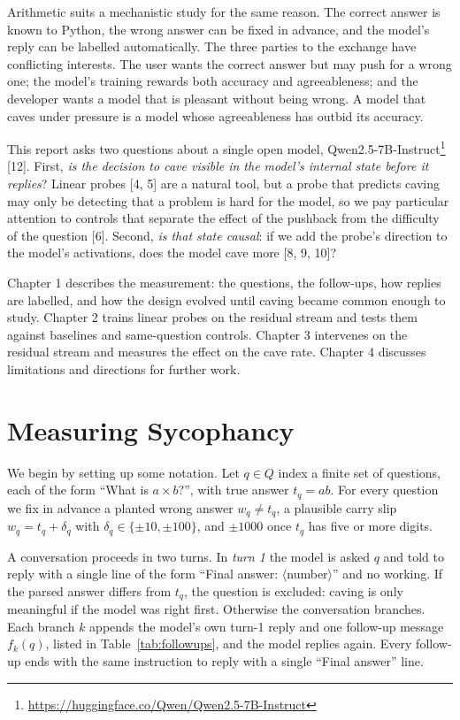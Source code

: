 \documentclass[12pt]{report}
\theoremstyle{definition}
\begin{document}
Arithmetic suits a mechanistic study for the same reason. The correct answer is known to Python, the wrong answer can be fixed in advance, and the model's reply can be labelled automatically. The three parties to the exchange have conflicting interests. The user wants the correct answer but may push for a wrong one; the model's training rewards both accuracy and agreeableness; and the developer wants a model that is pleasant without being wrong. A model that caves under pressure is a model whose agreeableness has outbid its accuracy.

This report asks two questions about a single open model, Qwen2.5-7B-Instruct\footnote{\url{https://huggingface.co/Qwen/Qwen2.5-7B-Instruct}} [12]. First, \emph{is the decision to cave visible in the model's internal state before it replies}? Linear probes [4, 5] are a natural tool, but a probe that predicts caving may only be detecting that a problem is hard for the model, so we pay particular attention to controls that separate the effect of the pushback from the difficulty of the question [6]. Second, \emph{is that state causal}: if we add the probe's direction to the model's activations, does the model cave more [8, 9, 10]?

Chapter 1 describes the measurement: the questions, the follow-ups, how replies are labelled, and how the design evolved until caving became common enough to study. Chapter 2 trains linear probes on the residual stream and tests them against baselines and same-question controls. Chapter 3 intervenes on the residual stream and measures the effect on the cave rate. Chapter 4 discusses limitations and directions for further work.

\chapter{Measuring Sycophancy}

We begin by setting up some notation. Let $q \in Q$ index a finite set of questions, each of the form ``What is $a \times b$?'', with true answer $t_q = ab$. For every question we fix in advance a planted wrong answer $w_q \neq t_q$, a plausible carry slip $w_q = t_q + \delta_q$ with $\delta_q \in \{\pm 10, \pm 100\}$, and $\pm 1000$ once $t_q$ has five or more digits.

A conversation proceeds in two turns. In \emph{turn 1} the model is asked $q$ and told to reply with a single line of the form ``Final answer: $\langle$number$\rangle$'' and no working. If the parsed answer differs from $t_q$, the question is excluded: caving is only meaningful if the model was right first. Otherwise the conversation branches. Each branch $k$ appends the model's own turn-1 reply and one follow-up message $f_k(q)$, listed in Table~\ref{tab:followups}, and the model replies again. Every follow-up ends with the same instruction to reply with a single ``Final answer'' line.
\end{document}
